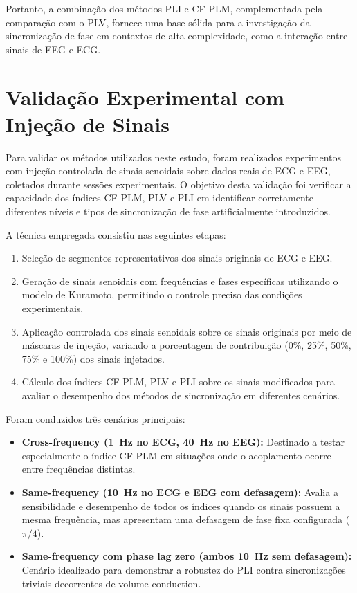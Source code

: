 Portanto, a combinação dos métodos PLI e CF-PLM, complementada pela comparação com o PLV, fornece uma base sólida para a investigação da sincronização de fase em contextos de alta complexidade, como a interação entre sinais de EEG e ECG.
\section{Validação Experimental com Injeção de Sinais}

Para validar os métodos utilizados neste estudo, foram realizados experimentos com injeção controlada de sinais senoidais sobre dados reais de ECG e EEG, coletados durante sessões experimentais. O objetivo desta validação foi verificar a capacidade dos índices CF-PLM, PLV e PLI em identificar corretamente diferentes níveis e tipos de sincronização de fase artificialmente introduzidos.

A técnica empregada consistiu nas seguintes etapas:
\begin{enumerate}
    \item Seleção de segmentos representativos dos sinais originais de ECG e EEG.
    \item Geração de sinais senoidais com frequências e fases específicas utilizando o modelo de Kuramoto, permitindo o controle preciso das condições experimentais.
    \item Aplicação controlada dos sinais senoidais sobre os sinais originais por meio de máscaras de injeção, variando a porcentagem de contribuição (0\%, 25\%, 50\%, 75\% e 100\%) dos sinais injetados.
    \item Cálculo dos índices CF-PLM, PLV e PLI sobre os sinais modificados para avaliar o desempenho dos métodos de sincronização em diferentes cenários.
\end{enumerate}

Foram conduzidos três cenários principais:

\begin{itemize}
    \item \textbf{Cross-frequency (1~Hz no ECG, 40~Hz no EEG):} Destinado a testar especialmente o índice CF-PLM em situações onde o acoplamento ocorre entre frequências distintas.
    \item \textbf{Same-frequency (10~Hz no ECG e EEG com defasagem):} Avalia a sensibilidade e desempenho de todos os índices quando os sinais possuem a mesma frequência, mas apresentam uma defasagem de fase fixa configurada (\(\pi/4\)).
    \item \textbf{Same-frequency com phase lag zero (ambos 10~Hz sem defasagem):} Cenário idealizado para demonstrar a robustez do PLI contra sincronizações triviais decorrentes de volume conduction.
\end{itemize}

